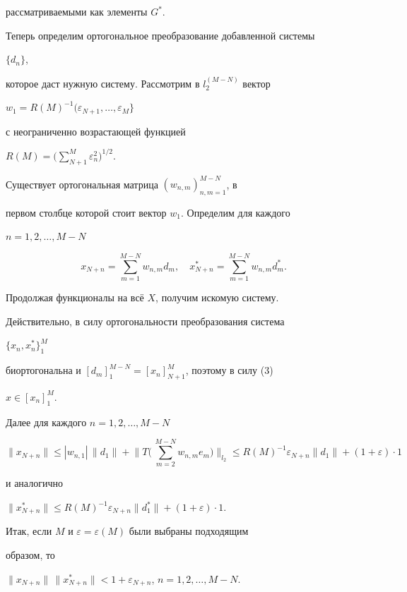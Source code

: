 \begin{pf}
рассматриваемыми как элементы $G^*$. 


 


Теперь определим ортогональное преобразование добавленной системы 


$\{d_n\}$, 


которое даст нужную систему. Рассмотрим в $l^{(M-N)}_2$ вектор 


$w_1=R(M)^{-1}(\varepsilon_{N+1},\dotsc,\varepsilon_M\}$ 


с неограниченно возрастающей функцией 


$R(M)=\Big(\sum\limits^M_{N+1}\varepsilon^2_n\Big)^{1/2}$. 


Существует ортогональная матрица $(w_{n,m})^{M-N}_{n,m=1}$, в 


первом столбце которой стоит вектор $w_1$. Определим для каждого 


$n=1,2,\dotsc,M-N$ 


$$ 


x_{N+n}=\sum^{M-N}_{m=1}w_{n,m}d_m,\quad 


x^*_{N+n}=\sum^{M-N}_{m=1}w_{n,m}d^*_m. 


$$ 


Продолжая функционалы на вс\"е $X$, получим искомую систему. 


Действительно, в силу ортогональности преобразования система 


$\{x_n,x^*_n\}^M_1$ 


биортогональна и $[d_m]^{M-N}_1=[x_n]^M_{N+1}$, поэтому в силу (3) 


$x\in[x_n]^M_1$. 


Далее для каждого $n=1,2,\dotsc,M-N$ 


$$ 


\|x_{N+n}\| \le |w_{n,1}|\, \|d_1\|+\Big\| T \Big( \, 


\sum^{M-N}_{m=2}w_{n,m}e_m\Big)\Big\|_{l_2}\le 


R(M)^{-1}\varepsilon_{N+n}\|d_1\|+(1+\varepsilon)\cdot 1 


$$ 


и аналогично


$\|x^*_{N+n}\|\le R(M)^{-1}\varepsilon_{N+n}\|d^*_1\|+ 


(1+\varepsilon)\cdot 1$. 


 


Итак, если $M$ и $\varepsilon=\varepsilon(M)$ были выбраны подходящим 


образом, то 


$\|x_{N+n}\|\,\|x^*_{N+n}\|<1+\varepsilon_{N+n}$, $n=1,2,\dotsc,M-N$. 


\end{pf} 


